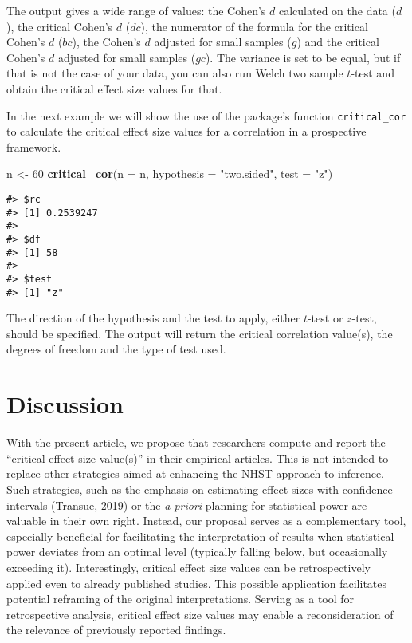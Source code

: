 \documentclass[
  man]{apa7}
\newenvironment{Shaded}{\begin{snugshade}}{\end{snugshade}}
\newcommand{\AttributeTok}[1]{\textcolor[rgb]{0.13,0.29,0.53}{#1}}
\newcommand{\DecValTok}[1]{\textcolor[rgb]{0.00,0.00,0.81}{#1}}
\newcommand{\FunctionTok}[1]{\textcolor[rgb]{0.13,0.29,0.53}{\textbf{#1}}}
\newcommand{\NormalTok}[1]{#1}
\newcommand{\OtherTok}[1]{\textcolor[rgb]{0.56,0.35,0.01}{#1}}
\newcommand{\StringTok}[1]{\textcolor[rgb]{0.31,0.60,0.02}{#1}}
\begin{document}
The output gives a wide range of values: the Cohen's \(d\) calculated on the data (\(d\)), the critical Cohen's \(d\) (\(dc\)), the numerator of the formula for the critical Cohen's \(d\) (\(bc\)), the Cohen's \(d\) adjusted for small samples (\(g\)) and the critical Cohen's \(d\) adjusted for small samples (\(gc\)). The variance is set to be equal, but if that is not the case of your data, you can also run Welch two sample \(t\)-test and obtain the critical effect size values for that.

In the next example we will show the use of the package's function \texttt{critical\_cor} to calculate the critical effect size values for a correlation in a prospective framework.

\begin{Shaded}
\begin{Highlighting}[]
\NormalTok{n }\OtherTok{\textless{}{-}} \DecValTok{60}
\FunctionTok{critical\_cor}\NormalTok{(}\AttributeTok{n =}\NormalTok{ n, }\AttributeTok{hypothesis =} \StringTok{"two.sided"}\NormalTok{, }\AttributeTok{test =} \StringTok{"z"}\NormalTok{)}
\end{Highlighting}
\end{Shaded}

\begin{verbatim}
#> $rc
#> [1] 0.2539247
#> 
#> $df
#> [1] 58
#> 
#> $test
#> [1] "z"
\end{verbatim}

The direction of the hypothesis and the test to apply, either \(t\)-test or \(z\)-test, should be specified. The output will return the critical correlation value(s), the degrees of freedom and the type of test used.

\hypertarget{discussion}{%
\section{Discussion}\label{discussion}}

With the present article, we propose that researchers compute and report the ``critical effect size value(s)'' in their empirical articles. This is not intended to replace other strategies aimed at enhancing the NHST approach to inference. Such strategies, such as the emphasis on estimating effect sizes with confidence intervals (Transue, 2019) or the \textit{a priori} planning for statistical power are valuable in their own right. Instead, our proposal serves as a complementary tool, especially beneficial for facilitating the interpretation of results when statistical power deviates from an optimal level (typically falling below, but occasionally exceeding it). Interestingly, critical effect size values can be retrospectively applied even to already published studies. This possible application facilitates potential reframing of the original interpretations. Serving as a tool for retrospective analysis, critical effect size values may enable a reconsideration of the relevance of previously reported findings.
\end{document}
